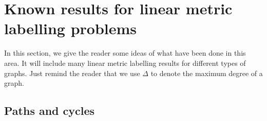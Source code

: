 \section{Known results for linear metric labelling problems}

In this section, we give the reader some ideas of what have been done in this area. It will include many linear metric labelling results for different types of graphs. Just remind the reader that we use $\Delta$ to denote the maximum degree of a graph. 


\subsection{Paths and cycles}

